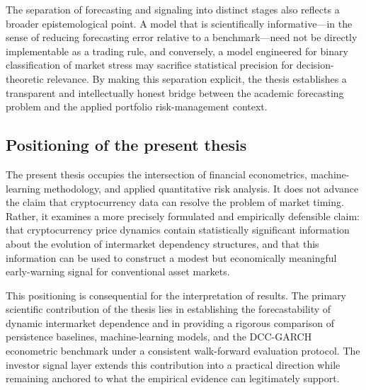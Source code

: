 The separation of forecasting and signaling into distinct stages also reflects a broader epistemological point. A model that is scientifically informative---in the sense of reducing forecasting error relative to a benchmark---need not be directly implementable as a trading rule, and conversely, a model engineered for binary classification of market stress may sacrifice statistical precision for decision-theoretic relevance. By making this separation explicit, the thesis establishes a transparent and intellectually honest bridge between the academic forecasting problem and the applied portfolio risk-management context.

\subsection{Positioning of the present thesis}

The present thesis occupies the intersection of financial econometrics, machine-learning methodology, and applied quantitative risk analysis. It does not advance the claim that cryptocurrency data can resolve the problem of market timing. Rather, it examines a more precisely formulated and empirically defensible claim: that cryptocurrency price dynamics contain statistically significant information about the evolution of intermarket dependency structures, and that this information can be used to construct a modest but economically meaningful early-warning signal for conventional asset markets.

This positioning is consequential for the interpretation of results. The primary scientific contribution of the thesis lies in establishing the forecastability of dynamic intermarket dependence and in providing a rigorous comparison of persistence baselines, machine-learning models, and the DCC-GARCH econometric benchmark under a consistent walk-forward evaluation protocol. The investor signal layer extends this contribution into a practical direction while remaining anchored to what the empirical evidence can legitimately support.
